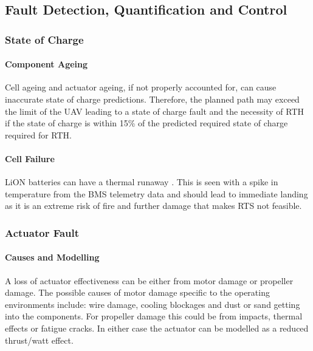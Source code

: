 \subsection{Fault Detection, Quantification and Control}

\subsubsection{State of Charge}
\paragraph{Component Ageing}
Cell ageing and actuator ageing, if not properly accounted for, can cause inaccurate state of charge predictions. Therefore, the planned path may exceed the limit of the \gls{UAV} leading to a state of charge fault and the necessity of \gls{RTH} if the state of charge is within 15\% of the predicted required state of charge required for \gls{RTH}.
\paragraph{Cell Failure}
\gls{LiON} batteries can have a thermal runaway \cite{REF}. This is seen with a spike in temperature from the \gls{BMS} telemetry data and should lead to immediate landing as it is an extreme risk of fire and further damage \cite{REF} that makes \gls{RTS} not feasible.

\subsubsection{Actuator Fault}
\paragraph{Causes and Modelling}
A loss of actuator effectiveness can be either from motor damage or propeller damage. The possible causes of motor damage specific to the operating environments include: wire damage, cooling blockages and dust or sand getting into the components. For propeller damage this could be from impacts, thermal effects or fatigue cracks. In either case the actuator can be modelled as a reduced thrust/watt effect.
